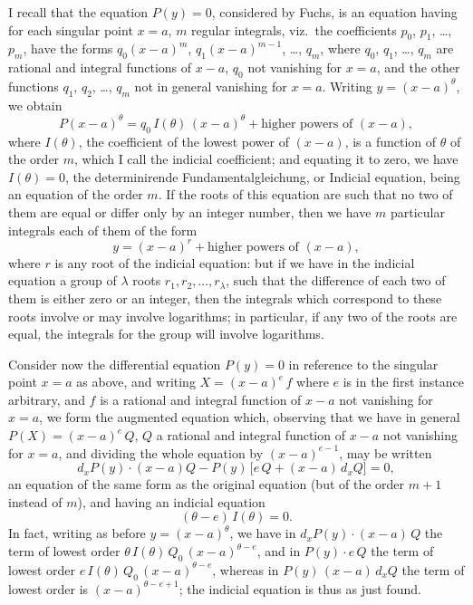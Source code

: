 \documentclass[11pt]{article}
\begin{document}
I recall that the equation $P(y) = 0$, considered by Fuchs, is an equation having for each singular point $x = a$, $m$ regular integrals, viz.\ the coefficients $p_{0}$, $p_{1}$, \ldots, $p_{m}$, have the forms $q_{0}(x-a)^{m}$, $q_{1}(x-a)^{m-1}$, \ldots, $q_{m}$, where $q_{0}$, $q_{1}$, \ldots, $q_{m}$ are rational and integral functions of $x-a$, $q_{0}$ not vanishing for $x = a$, and the other functions $q_{1}$, $q_{2}$, \ldots, $q_{m}$ not in general vanishing for $x = a$. Writing $y = (x-a)^{\theta}$, we obtain
\[
P(x-a)^{\theta} = q_{0}\,I(\theta)\,(x-a)^{\theta} + \text{higher powers of }(x-a),
\]
where $I(\theta)$, the coefficient of the lowest power of $(x-a)$, is a function of $\theta$ of the order $m$, which I call the indicial coefficient; and equating it to zero, we have $I(\theta) = 0$, the determinirende Fundamentalgleichung, or Indicial equation, being an equation of the order $m$. If the roots of this equation are such that no two of them are equal or differ only by an integer number, then we have $m$ particular integrals each of them of the form
\[
y = (x-a)^{r} + \text{higher powers of }(x-a),
\]
where $r$ is any root of the indicial equation: but if we have in the indicial equation a group of $\lambda$ roots $r_{1}, r_{2}, \ldots, r_{\lambda}$, such that the difference of each two of them is either zero or an integer, then the integrals which correspond to these roots involve or may involve logarithms; in particular, if any two of the roots are equal, the integrals for the group will involve logarithms.

Consider now the differential equation $P(y) = 0$ in reference to the singular point $x = a$ as above, and writing $X = (x-a)^{e}\,f$ where $e$ is in the first instance arbitrary, and $f$ is a rational and integral function of $x-a$ not vanishing for $x = a$, we form the augmented equation which, observing that we have in general $P(X) = (x-a)^{e}\,Q$, $Q$ a rational and integral function of $x-a$ not vanishing for $x = a$, and dividing the whole equation by $(x-a)^{e-1}$, may be written
\[
d_{x}P(y)\cdot (x-a)Q - P(y)\,\bigl[e\,Q + (x-a)\,d_{x}Q\bigr] = 0,
\]
an equation of the same form as the original equation (but of the order $m+1$ instead of $m$), and having an indicial equation
\[
(\theta - e)\,I(\theta) = 0.
\]
In fact, writing as before $y = (x-a)^{\theta}$, we have in $d_{x}P(y)\cdot (x-a)\,Q$ the term of lowest order $\theta\,I(\theta)\,Q_{0}\,(x-a)^{\theta-e}$, and in $P(y)\cdot e\,Q$ the term of lowest order $e\,I(\theta)\,Q_{0}\,(x-a)^{\theta-e}$, whereas in $P(y)\,(x-a)\,d_{x}Q$ the term of lowest order is $(x-a)^{\theta-e+1}$; the indicial equation is thus as just found.
\end{document}
